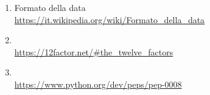 \begin{enumerate}
    	\item Formato della data \\\url{https://it.wikipedia.org/wiki/Formato\_della\_data}
        \item {}\\ %
        \url{https://12factor.net/#the_twelve_factors}
        \item {} \\\url{https://www.python.org/dev/peps/pep-0008}
	\end{enumerate}
